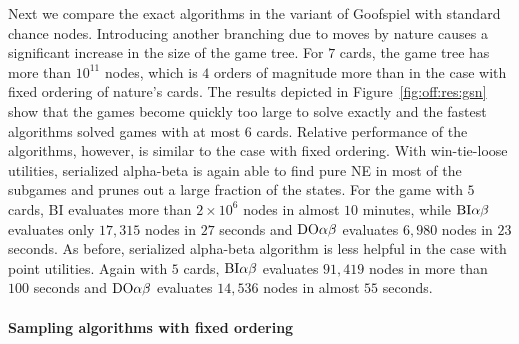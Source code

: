 Next we compare the exact algorithms in the variant of Goofspiel with standard chance nodes.
Introducing another branching due to moves by nature causes a significant increase in the size of the game tree.
For $7$ cards, the game tree has more than $10^{11}$ nodes, which is $4$ orders of magnitude more than in the case with fixed ordering of nature's cards.
The results depicted in Figure~\ref{fig:off:res:gsn} show that the games become quickly too large to solve exactly and the fastest algorithms solved games with at most $6$ cards.
Relative performance of the algorithms, however, is similar to the case with fixed ordering.
With win-tie-loose utilities, serialized alpha-beta is again able to find pure NE in most of the subgames and prunes out a large fraction of the states.
For the game with $5$ cards, BI evaluates more than $2 \times 10^6$ nodes in almost $10$ minutes, while $\textrm{BI}\alpha\beta$ evaluates only $17,315$ nodes in $27$ seconds and $\textrm{DO}\alpha\beta$ evaluates $6,980$ nodes in $23$ seconds.
As before, serialized alpha-beta algorithm is less helpful in the case with point utilities.
Again with $5$ cards, $\textrm{BI}\alpha\beta$ evaluates $91,419$ nodes in more than $100$ seconds and $\textrm{DO}\alpha\beta$ evaluates $14,536$ nodes in almost $55$ seconds.

\paragraph{Sampling algorithms with fixed ordering}

